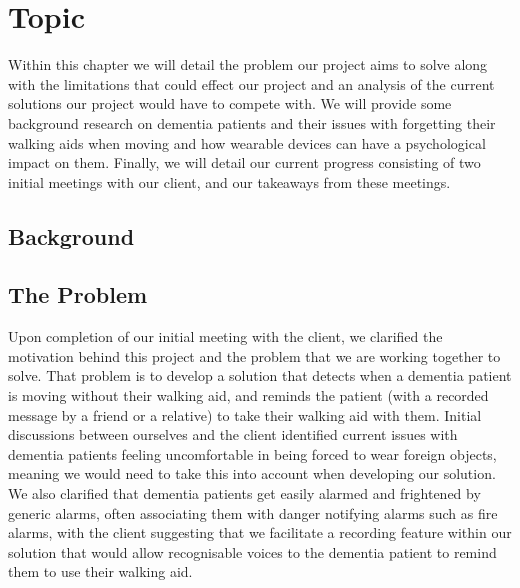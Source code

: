 \chapter{Topic}
\label{chap:topic}

Within this chapter we will detail the problem our project aims to solve along with the limitations that could effect our project and an analysis of the current solutions our project would have to compete with. We will provide some background research on dementia patients and their issues with forgetting their walking aids when moving and how wearable devices can have a psychological impact on them. Finally, we will detail our current progress consisting of two initial meetings with our client, and our takeaways from these meetings.

\section{Background}

\section{The Problem}
    Upon completion of our initial meeting with the client, we clarified the motivation behind this project and the problem that we are working together to solve. That problem is to develop a solution that detects when a dementia patient is moving without their walking aid, and reminds the patient (with a recorded message by a friend or a relative) to take their walking aid with them. Initial discussions between ourselves and the client identified current issues with dementia patients feeling uncomfortable in being forced to wear foreign objects, meaning we would need to take this into account when developing our solution. We also clarified that dementia patients get easily alarmed and frightened by generic alarms, often associating them with danger notifying alarms such as fire alarms, with the client suggesting that we facilitate a recording feature within our solution that would allow recognisable voices to the dementia patient to remind them to use their walking aid.

